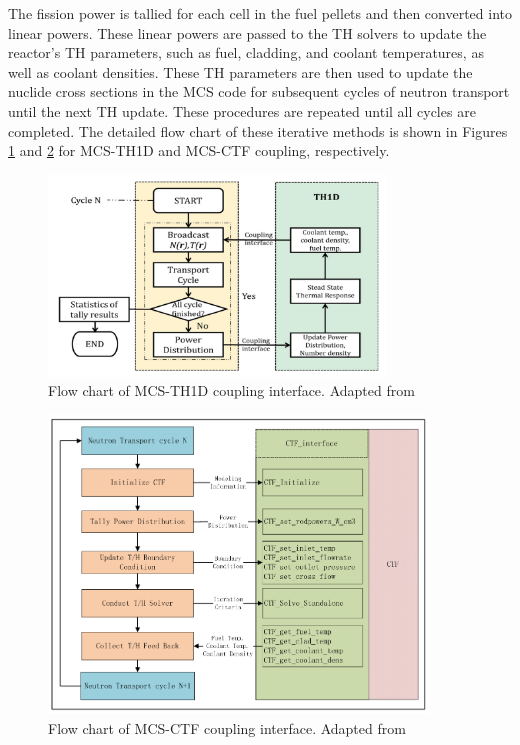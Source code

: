 The fission power is tallied for each cell in the fuel pellets and then converted into linear powers. These linear powers are passed to the TH solvers to update the reactor's TH parameters, such as fuel, cladding, and coolant temperatures, as well as coolant densities. These TH parameters are then used to update the nuclide cross sections in the MCS code for subsequent cycles of neutron transport until the next TH update. These procedures are repeated until all cycles are completed. The detailed flow chart of these iterative methods is shown in Figures \ref{fig_30a} and \ref{fig_30b} for MCS-TH1D and MCS-CTF coupling, respectively.
\begin{figure}
    \centering
    \includegraphics[width=0.8\textwidth]{figs/mcs_th1d.png}
    \caption[Flow chart of MCS-TH1D coupling interface.]{Flow chart of MCS-TH1D coupling interface. Adapted from \cite{yu_2018}}
    \label{fig_30a}
\end{figure}
\begin{figure}
    \centering
    \includegraphics[width=0.9\textwidth]{figs/mcs_ctf.png}
    \caption[Flow chart of MCS-CTF coupling interface.]{Flow chart of MCS-CTF coupling interface. Adapted from \cite{yu_2018}}
    \label{fig_30b}
\end{figure}


